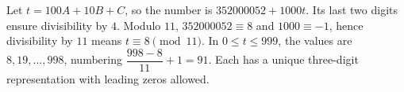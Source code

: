 Let $t=100A+10B+C$, so the number is $352000052+1000t$. Its last two digits ensure divisibility by $4$. Modulo $11$, $352000052\equiv8$ and $1000\equiv-1$, hence divisibility by $11$ means $t\equiv8\pmod{11}$. In $0\le t\le999$, the values are $8,19,\ldots,998$, numbering $\dfrac{998-8}{11}+1=\boxed{91}$. Each has a unique three-digit representation with leading zeros allowed.
